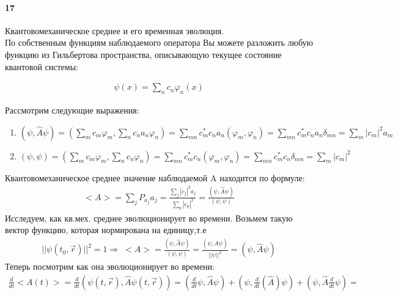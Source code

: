 



\paragraph{17}
Квантовомеханическое среднее и его временная эволюция.\\

По собственным функциям наблюдаемого оператора Вы можете разложить любую функцию из Гильбертова пространства, описывающую текущее состояние квантовой системы:

\begin{gather*}
	\psi (x) = \sum_nc_n\varphi_n(x)
\end{gather*}

Рассмотрим следующие выражения:
\begin{enumerate}
	\item $(\psi,\hat A \psi) = \left(\sum_mc_m\varphi_m,\sum_nc_na_n\varphi_n\right) = \sum_{mn}c_m^*c_na_n(\varphi_m,\varphi_n) = \sum_{mn}c_m^*c_na_n\delta_{mn} = \sum_m|c_m|^2a_m $
	\item $(\psi,\psi) = \left(\sum_mc_m\varphi_m,\sum_nc_n\varphi_n\right) = \sum_{mn}c_m^*c_n(\varphi_m,\varphi_n) = \sum_{mn}c_m^*c_n\delta_{mn} = \sum_m|c_m|^2 $
\end{enumerate}

Квантовомеханическое среднее значение наблюдаемой A находится по формуле:
\begin{gather*}
	<A> = \sum_jP_{a_j}a_j = \frac{\sum_j|c_j|^2a_j}{\sum_p|c_p|^2} = \frac{(\psi,\hat{A}\psi)}{(\psi,\psi)}
\end{gather*}
Исследуем, как кв.мех. среднее эволюционирует во времени. Возьмем такую вектор функцию, которая нормирована на единицу,т.е
\begin{gather*}
	\vert\vert \psi(t_0,\vec{r})\vert\vert ^2 = 1 \Rightarrow\;  <A> = \frac{(\psi,\hat{A}\psi)}{(\psi,\psi)} = \frac{(\psi,\hat{A}\psi)}{\vert\vert\psi\vert\vert^2} = (\psi,\hat{A}\psi)
\end{gather*}
Теперь посмотрим как она эволюционирует во времени:
\begin{gather*}
	\frac{d}{dt}<A(t)> = \frac{d}{dt}\left(\psi(t,\vec{r}), \hat{A} \psi(t,\vec{r})\right) = \left(\frac{d}{dt}\psi,\hat{A}\psi\right)+\left(\psi,\frac{d}{dt}(\hat{A})\psi\right)+\left(\psi,\hat{A}\frac{d}{dt}\psi\right) = 
\end{gather*}

